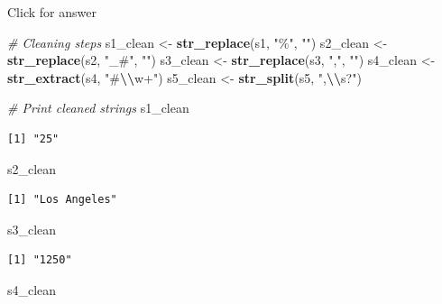 \documentclass[
]{book}
\newenvironment{Shaded}{\begin{snugshade}}{\end{snugshade}}
\newcommand{\CommentTok}[1]{\textcolor[rgb]{0.56,0.35,0.01}{\textit{#1}}}
\newcommand{\FunctionTok}[1]{\textcolor[rgb]{0.13,0.29,0.53}{\textbf{#1}}}
\newcommand{\NormalTok}[1]{#1}
\newcommand{\OtherTok}[1]{\textcolor[rgb]{0.56,0.35,0.01}{#1}}
\newcommand{\SpecialCharTok}[1]{\textcolor[rgb]{0.81,0.36,0.00}{\textbf{#1}}}
\newcommand{\StringTok}[1]{\textcolor[rgb]{0.31,0.60,0.02}{#1}}
\begin{document}
Click for answer

\begin{Shaded}
\begin{Highlighting}[]
\CommentTok{\# Cleaning steps}
\NormalTok{s1\_clean }\OtherTok{\textless{}{-}} \FunctionTok{str\_replace}\NormalTok{(s1, }\StringTok{"\%"}\NormalTok{, }\StringTok{""}\NormalTok{)}
\NormalTok{s2\_clean }\OtherTok{\textless{}{-}} \FunctionTok{str\_replace}\NormalTok{(s2, }\StringTok{"\_\#"}\NormalTok{, }\StringTok{""}\NormalTok{)}
\NormalTok{s3\_clean }\OtherTok{\textless{}{-}} \FunctionTok{str\_replace}\NormalTok{(s3, }\StringTok{","}\NormalTok{, }\StringTok{""}\NormalTok{)}
\NormalTok{s4\_clean }\OtherTok{\textless{}{-}} \FunctionTok{str\_extract}\NormalTok{(s4, }\StringTok{"\#}\SpecialCharTok{\textbackslash{}\textbackslash{}}\StringTok{w+"}\NormalTok{)}
\NormalTok{s5\_clean }\OtherTok{\textless{}{-}} \FunctionTok{str\_split}\NormalTok{(s5, }\StringTok{",}\SpecialCharTok{\textbackslash{}\textbackslash{}}\StringTok{s?"}\NormalTok{)}

\CommentTok{\# Print cleaned strings}
\NormalTok{s1\_clean}
\end{Highlighting}
\end{Shaded}

\begin{verbatim}
[1] "25"
\end{verbatim}

\begin{Shaded}
\begin{Highlighting}[]
\NormalTok{s2\_clean}
\end{Highlighting}
\end{Shaded}

\begin{verbatim}
[1] "Los Angeles"
\end{verbatim}

\begin{Shaded}
\begin{Highlighting}[]
\NormalTok{s3\_clean}
\end{Highlighting}
\end{Shaded}

\begin{verbatim}
[1] "1250"
\end{verbatim}

\begin{Shaded}
\begin{Highlighting}[]
\NormalTok{s4\_clean}
\end{Highlighting}
\end{Shaded}
\end{document}
